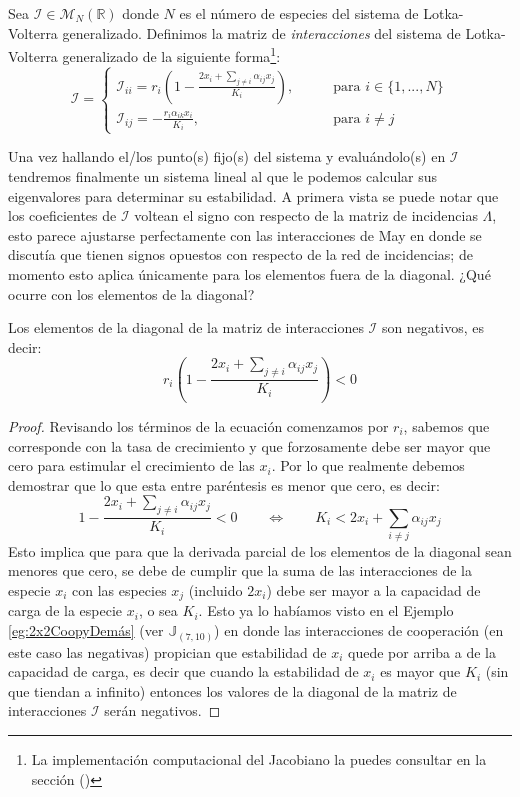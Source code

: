 \begin{definición}
	Sea $\mathcal{I}\in\mathcal{M}_N(\mathbb{R})$ donde $N$ es el número de especies del sistema de Lotka-Volterra generalizado. Definimos la matriz de \textit{interacciones} del sistema de Lotka-Volterra generalizado de la siguiente forma\footnote{La implementación computacional del Jacobiano la puedes consultar en la sección ()}:
	\begin{equation}
		\mathcal{I}=\begin{cases}
			\mathcal{I}_{ii} = r_i \left (1-\frac{2x_i+\sum_{j\neq i}\alpha_{ij}x_j}{K_i}\right ),\qquad&\text{para }i\in\{1,...,N\}\\
			\mathcal{I}_{ij} = -\frac{r_i\alpha_{ik}x_i}{K_i},\qquad&\text{para }i\neq j
		\end{cases}
	\end{equation}
\end{definición}
Una vez hallando el/los punto(s) fijo(s) del sistema y evaluándolo(s) en $\mathcal{I}$ tendremos finalmente un sistema lineal al que le podemos calcular sus eigenvalores para determinar su estabilidad. A primera vista se puede notar que los coeficientes de $\mathcal{I}$ voltean el signo con respecto de la matriz de incidencias $\Lambda$, esto parece ajustarse perfectamente con las interacciones de May en donde se discutía que tienen signos opuestos con respecto de la red de incidencias; de momento esto aplica únicamente para los elementos fuera de la diagonal. ¿Qué ocurre con los elementos de la diagonal?
\begin{proposición}
	Los elementos de la diagonal de la matriz de interacciones $\mathcal{I}$ son negativos, es decir:
	$$
	r_i \left (1-\frac{2x_i+\sum_{j\neq i}\alpha_{ij}x_j}{K_i}\right )<0
	$$	
	\begin{proof}
		Revisando los términos de la ecuación comenzamos por $r_i$, sabemos que corresponde con la tasa de crecimiento y que forzosamente debe ser mayor que cero para estimular el crecimiento de las $x_i$. Por lo que realmente debemos demostrar que lo que esta entre paréntesis es menor que cero, es decir:
		$$
		1-\frac{2x_i+\sum_{j\neq i}\alpha_{ij}x_j}{K_i}<0\qquad\Longleftrightarrow\qquad K_i<2x_i+\sum_{i\neq j}\alpha_{ij}x_j
		$$
		Esto implica que para que la derivada parcial de los elementos de la diagonal sean menores que cero, se debe de cumplir que la suma de las interacciones de la especie $x_i$ con las especies $x_j$ (incluido $2x_i$) debe ser mayor a la capacidad de carga de la especie $x_i$, o sea $K_i$. Esto ya lo habíamos visto en el Ejemplo \ref{eg:2x2CoopyDemás} (ver $\mathbb{J}_{(7,10)}$) en donde las interacciones de cooperación (en este caso las negativas) propician que estabilidad de $x_i$ quede por arriba a de la capacidad de carga, es decir que cuando la estabilidad de $x_i$ es mayor que $K_i$ (sin que tiendan a infinito) entonces los valores de la diagonal de la matriz de interacciones $\mathcal{I}$ serán negativos.
	\end{proof}
\end{proposición}
